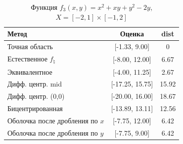 \begin{table}[H]
\centering
\begin{tabular}{|l|c|c|}
\hline
Метод & Оценка & dist \\
\hline
Точная область & [-1.33, 9.00] & 0 \\
Естественное $f_{\natural}$ & [-8.00, 12.00] & 6.67 \\
Эквивалентное & [-4.00, 11.25] & 2.67 \\
Дифф. центр. mid & [-17.25, 15.75] & 15.92 \\
Дифф. центр. (0,0) & [-20.00, 16.00] & 18.67 \\
Бицентрированная & [-13.89, 13.11] & 12.56 \\
Оболочка после дробления по $x$ & [-7.75, 12.00] & 6.42 \\
Оболочка после дробления по $y$ & [-7.75, 9.00] & 6.42 \\
\hline
\end{tabular}
\caption{Функция $f_3(x,y)=x^2+xy+y^2-2y$, $X=[-2,1]\times[-1,2]$}
\end{table}
